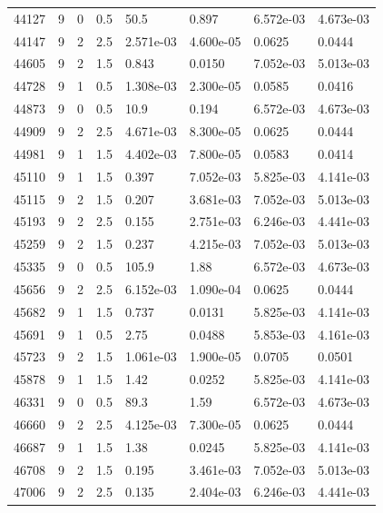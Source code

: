 \documentclass[preview]{standalone}
\begin{document}
{{{{{{{{\begin{tabular}{L{1.2cm}C{1.2cm} C{0.3cm}C{0.5cm} C{1.4cm}C{1.4cm} C{1.4cm}C{1.4cm}}
  44127  &     9  & 0     & 0.5 &  50.5  & 0.897  & 6.572e-03 &  4.673e-03   \\ 
  44147  &     9  & 2     & 2.5 &  2.571e-03  & 4.600e-05  & 0.0625 &  0.0444   \\ 
  44605  &     9  & 2     & 1.5 &  0.843  & 0.0150  & 7.052e-03 &  5.013e-03   \\ 
  44728  &     9  & 1     & 0.5 &  1.308e-03  & 2.300e-05  & 0.0585 &  0.0416   \\ 
  44873  &     9  & 0     & 0.5 &  10.9  & 0.194  & 6.572e-03 &  4.673e-03   \\ 
  44909  &     9  & 2     & 2.5 &  4.671e-03  & 8.300e-05  & 0.0625 &  0.0444   \\ 
  44981  &     9  & 1     & 1.5 &  4.402e-03  & 7.800e-05  & 0.0583 &  0.0414   \\ 
  45110  &     9  & 1     & 1.5 &  0.397  & 7.052e-03  & 5.825e-03 &  4.141e-03   \\ 
  45115  &     9  & 2     & 1.5 &  0.207  & 3.681e-03  & 7.052e-03 &  5.013e-03   \\ 
  45193  &     9  & 2     & 2.5 &  0.155  & 2.751e-03  & 6.246e-03 &  4.441e-03   \\ 
  45259  &     9  & 2     & 1.5 &  0.237  & 4.215e-03  & 7.052e-03 &  5.013e-03   \\ 
  45335  &     9  & 0     & 0.5 &  105.9  & 1.88  & 6.572e-03 &  4.673e-03   \\ 
  45656  &     9  & 2     & 2.5 &  6.152e-03  & 1.090e-04  & 0.0625 &  0.0444   \\ 
  45682  &     9  & 1     & 1.5 &  0.737  & 0.0131  & 5.825e-03 &  4.141e-03   \\ 
  45691  &     9  & 1     & 0.5 &  2.75  & 0.0488  & 5.853e-03 &  4.161e-03   \\ 
  45723  &     9  & 2     & 1.5 &  1.061e-03  & 1.900e-05  & 0.0705 &  0.0501   \\ 
  45878  &     9  & 1     & 1.5 &  1.42  & 0.0252  & 5.825e-03 &  4.141e-03   \\ 
  46331  &     9  & 0     & 0.5 &  89.3  & 1.59  & 6.572e-03 &  4.673e-03   \\ 
  46660  &     9  & 2     & 2.5 &  4.125e-03  & 7.300e-05  & 0.0625 &  0.0444   \\ 
  46687  &     9  & 1     & 1.5 &  1.38  & 0.0245  & 5.825e-03 &  4.141e-03   \\ 
  46708  &     9  & 2     & 1.5 &  0.195  & 3.461e-03  & 7.052e-03 &  5.013e-03   \\ 
  47006  &     9  & 2     & 2.5 &  0.135  & 2.404e-03  & 6.246e-03 &  4.441e-03   \\ 

\end{tabular}}}}}}}}}
\end{document}

